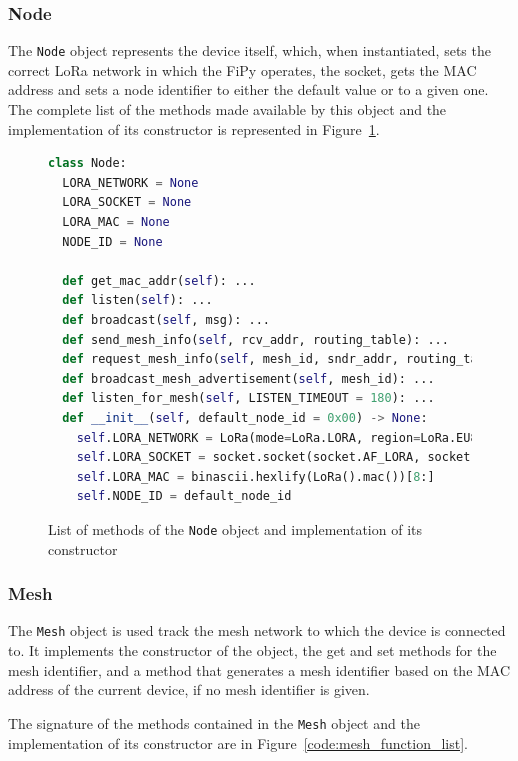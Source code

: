 			\subsubsection{Node}
				
				The \texttt{Node} object represents the device itself, which, when instantiated, sets the correct LoRa network in which the FiPy operates, the socket, gets the MAC address and sets a node identifier to either the default value or to a given one.
				The complete list of the methods made available by this object and the implementation of its constructor is represented in Figure~\ref{code:node_function_list}.
				
				\begin{figure}[h]
					\begin{lstlisting}[language=python]
class Node:    
  LORA_NETWORK = None
  LORA_SOCKET = None
  LORA_MAC = None
  NODE_ID = None
  
  def get_mac_addr(self): ...
  def listen(self): ...
  def broadcast(self, msg): ...
  def send_mesh_info(self, rcv_addr, routing_table): ...
  def request_mesh_info(self, mesh_id, sndr_addr, routing_table): ...
  def broadcast_mesh_advertisement(self, mesh_id): ...
  def listen_for_mesh(self, LISTEN_TIMEOUT = 180): ...
  def __init__(self, default_node_id = 0x00) -> None:
    self.LORA_NETWORK = LoRa(mode=LoRa.LORA, region=LoRa.EU868)
    self.LORA_SOCKET = socket.socket(socket.AF_LORA, socket.SOCK_RAW)
    self.LORA_MAC = binascii.hexlify(LoRa().mac())[8:]
    self.NODE_ID = default_node_id
					\end{lstlisting}
					\caption{List of methods of the \texttt{Node} object and implementation of its constructor}
					\label{code:node_function_list}
				\end{figure}
			
			\subsubsection{Mesh}
			
				The \texttt{Mesh} object is used track the mesh network to which the device is connected to.
				It implements the constructor of the object, the get and set methods for the mesh identifier, and a method that generates a mesh identifier based on the MAC address of the current device, if no mesh identifier is given.
				
				The signature of the methods contained in the \texttt{Mesh} object and the implementation of its constructor are in Figure~\ref{code:mesh_function_list}.
				
